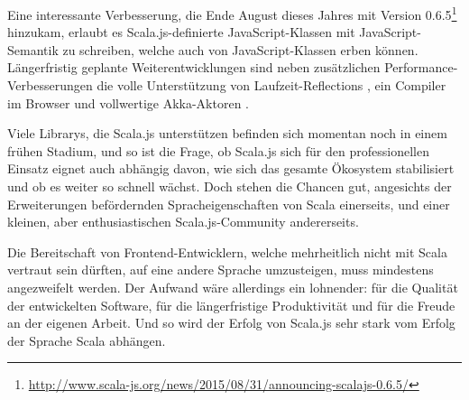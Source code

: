 \documentclass[a4paper, 12pt, hidelinks, listof=totoc, listoftables=totoc, bibliography=totoc]{scrreprt}
\begin{document}
Eine interessante Verbesserung, die Ende August dieses Jahres mit Version 0.6.5\footnote{\url{http://www.scala-js.org/news/2015/08/31/announcing-scalajs-0.6.5/}} hinzukam, erlaubt es Scala.js-definierte JavaScript-Klassen mit JavaScript-Semantik zu schreiben, welche auch von JavaScript-Klassen erben können. Längerfristig geplante Weiterentwicklungen sind neben zusätzlichen Performance-Verbesserungen die volle Unterstützung von Laufzeit-Reflections \cite[S. 2]{doeraene2013.TDI}, ein Compiler im Browser \cite[Folie 39, Min. 39]{doeraene2014.WHB} und vollwertige Akka-Aktoren \cite[Folie 39, Min. 39]{doeraene2014.WHB}.

Viele Librarys, die Scala.js unterstützen befinden sich momentan noch in einem frühen Stadium, und so ist die Frage, ob Scala.js sich für den professionellen Einsatz eignet auch abhängig davon, wie sich das gesamte Ökosystem stabilisiert und ob es weiter so schnell wächst. Doch stehen die Chancen gut, angesichts der Erweiterungen befördernden Spracheigenschaften von Scala einerseits, und einer kleinen, aber enthusiastischen Scala.js-Community andererseits.

Die Bereitschaft von Frontend-Entwicklern, welche mehrheitlich nicht mit Scala vertraut sein dürften, auf eine andere Sprache umzusteigen, muss mindestens angezweifelt werden. Der Aufwand wäre allerdings ein lohnender: für die Qualität der entwickelten Software, für die längerfristige Produktivität und für die Freude an der eigenen Arbeit. Und so wird der Erfolg von Scala.js sehr stark vom Erfolg der Sprache Scala abhängen.










\end{document}

